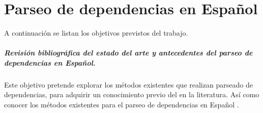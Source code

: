 \chapter{Parseo de dependencias en Español}\label{ch:depparsing}









A continuación se listan los objetivos previstos del trabajo.

\paragraph{Revisión bibliográfica del estado del arte y antecedentes del parseo
  de dependencias en Español.} Este objetivo pretende explorar los métodos
existentes que realizan parseado de dependencias, para adquirir un conocimiento
previo del  en la literatura. Así como conocer los
métodos existentes para el parseo de dependencias en Español
\cite{ballesteros2016}.

